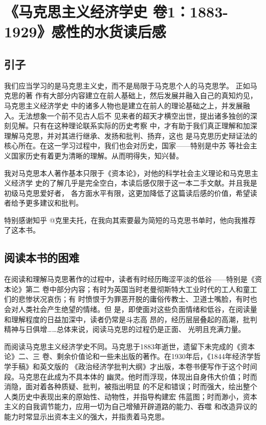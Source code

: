 \chapter{《马克思主义经济学史 卷1：1883-1929》感性的水货读后感}

\section{引子}

我们应当学习的是马克思主义史，而不是局限于马克思个人的马克思学。 正如马克思的著
作有大部分内容建立在前人基础上，然后发展并融入自己的真知灼见，马克思主义经济学史
中的诸多人物也是建立在前人的理论基础之上，并发展融入。无法想象一个前不见古人后不
见来者的超天才横空出世，提出诸多独创的深刻见解。只有在这种理论联系实际的历史考察
中，才有助于我们真正理解和加深理解马克思，并对其进行继承、发扬和批判、扬弃，这也
是马克思历史辩证法的核心所在。在这一学习过程中，我们也会对历史，国家——特别是中苏
等社会主义国家历史有着更为清晰的理解。从而明得失，知兴替。

我对马克思本人著作基本只限于《资本论》，对他的科学社会主义理论和马克思主义经济学
史的了解几乎是完全空白，本读后感仅限于这一本二手文献。并且我是初级马克思爱好者，
各方面水平有限，这更加降低了这篇读后感的价值，希望读者给予更多建议和批判。

特别感谢知乎 @克里夫托，在我向其索要最为简短的马克思书单时，他向我推荐了这本书。

\section{阅读本书的困难}

在阅读和理解马克思著作的过程中，读者有时经历晦涩平淡的低谷——特别是《资本论》第二
卷中部分内容；有时为英国当时老曼彻斯特大工业时代的工人和童工们的悲惨状况哀伤；有
时愤恨于为罪恶开脱的庸俗传教士、卫道士嘴脸，有时也会对人类社会产生绝望的情绪。但
是，即使面对这些负面情绪和低谷，在阅读量和理解程度的日益加深中，读者仍常是斗志高
昂的，经历层层叠起的高潮，批判精神与日俱增……总体来说，阅读马克思的过程仍是正面、
光明且充满力量。

而阅读马克思主义经济学史不同。马克思于1883年逝世，遗留下未完成的《资本论》二、三
卷、剩余价值论和一些未出版的著作。在1930年后，《1844年经济学哲学手稿》和英文版的
《政治经济学批判大纲》才出版，本卷书便写作于这个时间段。马克思在此成为不具本体的
幽灵。他时而浮现，体现出自身伟大价值；时而消隐，面对着各种质疑、批判，被指出明显
的不足和错误；时而强大，绘出整个人类历史中表现出来的原始性、动物性，并指导构建宏
伟蓝图；时而渺小，资本主义的自我调节能力，应用一切为自己增殖开辟道路的能力、吞噬
和改造异议的能力时常显示出资本主义的强大，并指责着马克思。


